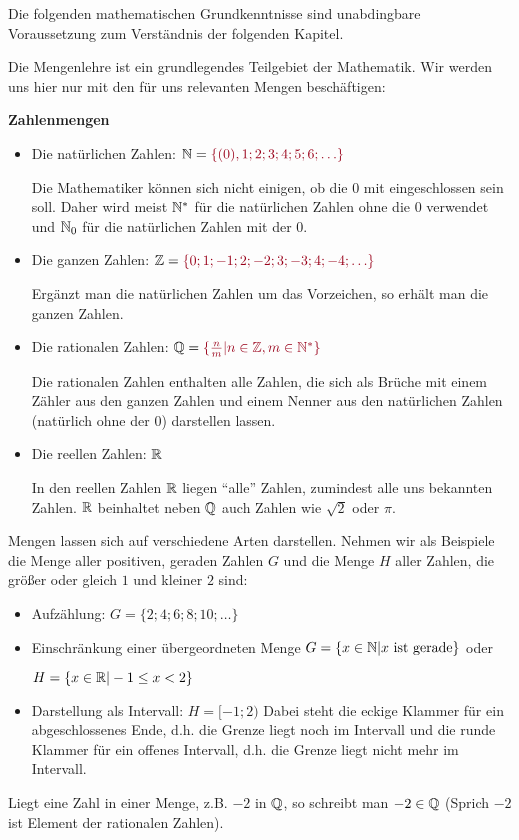 Die folgenden mathematischen Grundkenntnisse sind unabdingbare Voraussetzung zum Verständnis der folgenden Kapitel.

Die Mengenlehre ist ein grundlegendes Teilgebiet der Mathematik. Wir werden uns hier nur mit den für uns relevanten Mengen beschäftigen:
\begin{tcolorbox}
	\textbf{Zahlenmengen}
	\begin{itemize}
		\item Die natürlichen Zahlen: \({\N=\textcolor{loestc}{\{(0), 1; 2; 3; 4; 5; 6; \ldots\}}}\)

        Die Mathematiker können sich nicht einigen, ob die 0 mit eingeschlossen sein soll. Daher wird meist \(\mathbb{N}^*\) für die natürlichen Zahlen ohne die 0 verwendet und \(\mathbb{N}_0\) für die natürlichen Zahlen mit der 0.
		\item Die ganzen Zahlen: \({\Z=\textcolor{loestc}{\{0; 1; -1; 2; -2; 3; -3; 4; -4;\ldots\}}}\)

        Ergänzt man die natürlichen Zahlen um das Vorzeichen, so erhält man die ganzen Zahlen.
		\item Die rationalen Zahlen: \({\Q=\textcolor{loestc}{\{\frac{n}{m}|n\in\Z, m\in\N^*\}}}\)

        Die rationalen Zahlen enthalten alle Zahlen, die sich als Brüche mit einem Zähler aus den ganzen Zahlen und einem Nenner aus den natürlichen Zahlen (natürlich ohne der 0) darstellen lassen.
		\item Die reellen Zahlen: \(\mathbb{R}\)

        In den reellen Zahlen \(\mathbb{R}\) liegen "`alle"' Zahlen, zumindest alle uns bekannten Zahlen. \(\mathbb{R}\) beinhaltet neben \(\mathbb{Q}\) auch Zahlen wie \(\sqrt{2}\) oder \(\pi\).
	\end{itemize}
\end{tcolorbox}
Mengen lassen sich auf verschiedene Arten darstellen. Nehmen wir als Beispiele die Menge aller positiven, geraden Zahlen \(G\) und die Menge \(H\) aller Zahlen, die größer oder gleich \(1\) und kleiner \(2\) sind:
\begin{itemize}
	\item Aufzählung: \({G=\{2; 4; 6; 8; 10;\ldots \}}\)
	\item Einschränkung einer übergeordneten Menge \({G=\{x\in\mathbb{N}|x\text{ ist gerade}\}}\) oder

	\({H=\{x\in\mathbb{R}|-1\leq x<2\}}\)
	\item Darstellung als Intervall: \(H=[-1;2)\) Dabei steht die eckige Klammer für ein abgeschlossenes Ende, d.h. die Grenze liegt noch im Intervall und die runde Klammer für ein offenes Intervall, d.h. die Grenze liegt nicht mehr im Intervall.
\end{itemize}
Liegt eine Zahl in einer Menge, z.B. \(-2\) in \(\mathbb{Q}\), so schreibt man \({-2\in\mathbb{Q}}\) (Sprich \(-2\) ist Element der rationalen Zahlen).